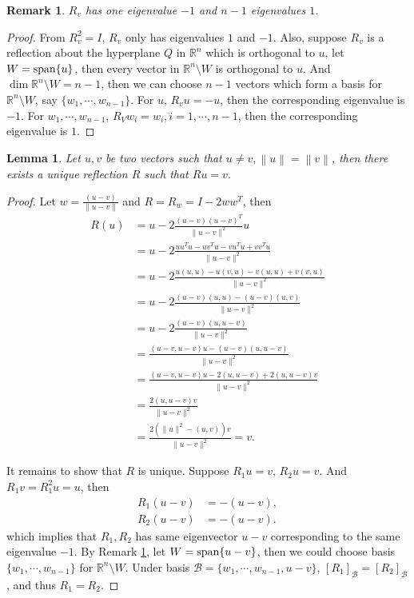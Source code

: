 \documentclass[11pt]{book}
\newtheorem{lemma}[theorem]{Lemma}
\newtheorem{remark}{Remark}[chapter]
\theoremstyle{definition}
\numberwithin{equation}{chapter}
\begin{document}
\begin{subappendices}
\begin{remark}\label{eigenvalue_of_reflection}
$R_v$ has one eigenvalue $-1$ and $n-1$ eigenvalues $1$.
\end{remark}
\begin{proof}
From $R_v^2 = I$, $R_v$ only has eigenvalues $1$ and $-1$. Also, suppose $R_v$ is a reflection about the hyperplane $Q$ in $\mathbb{R}^n$ which is orthogonal to $u$, let $W = {\rm  span}\{u\}$, then every vector in $\mathbb{R}^n\setminus W$ is orthogonal to $u$. And $\dim  \mathbb{R}^n\setminus W = n - 1$, then we can choose $n - 1$ vectors which form a basis for $\mathbb{R}^n\setminus W$, say $\{w_1, \cdots, w_{n-1}\}$. For $u$, $R_v u = - u$, then the corresponding eigenvalue is $-1$. For $w_1, \cdots, w_{n-1}$, $R_V w_i = w_i, i = 1, \cdots, n-1$, then the corresponding eigenvalue is $1$.
\end{proof}

\medskip

\begin{lemma}{\rm \cite{35}}
Let $u, v$ be two vectors such that $u \neq v, \left\|u\right\| = \left\|v\right\|$, then there exists a unique reflection $R$ such that $Ru = v$.
\end{lemma}
\begin{proof}
Let $w = \frac{(u-v)}{\|u-v\|}$ and $R = R_w = I - 2 ww^T$, then
\begin{align*}
    R(u) & = u - 2 \frac{(u-v)(u-v)^T}{\|u-v\|^2}u \\
    & = u - 2 \frac{uu^Tu - uv^Tu - vu^Tu + vv^Tu}{\|u-v\|^2} \\
    & = u - 2 \frac{u(u,u) - u(v,u) - v(u,u) + v(v,u)}{\|u-v\|^2} \\
    & = u - 2 \frac{(u-v)(u,u) - (u-v)(u,v)}{\|u-v\|^2} \\
    & = u - 2 \frac{(u-v)(u,u-v)}{\|u-v\|^2} \\
    & = \frac{(u-v,u-v)u - (u-v)(u,u-v)}{\|u-v\|^2} \\
    & = \frac{(u-v,u-v)u - 2(u,u-v) + 2(u,u-v)v}{\|u-v\|^2} \\
    & = \frac{2(u,u-v)v}{\|u-v\|^2} \\
    & = \frac{2(\|u\|^2 - (u,v))v}{\|u-v\|^2} = v.
\end{align*}

It remains to show that $R$ is unique. Suppose $R_1 u = v$, $R_2 u = v$. And $R_1 v = R_1^2 u = u$, then 
\begin{align*}
    R_1 (u-v) & = - (u-v), \\
    R_2 (u-v) & = - (u-v).
\end{align*}
which implies that $R_1, R_2$ has same eigenvector $u - v$ corresponding to the same eigenvalue $-1$. By Remark \ref{eigenvalue_of_reflection}, let $W = {\rm span}\{u-v\}$, then we could choose basis $\{w_1, \cdots, w_{n-1}\}$ for $\mathbb{R}^n \setminus W$. Under basis $\mathcal{B} = \{w_1, \cdots, w_{n-1}, u-v\}$, $[R_1]_{\mathcal{B}} = [R_2]_{\mathcal{B}}$, and thus $R_1 = R_2$.
\end{proof}


\end{subappendices}
\end{document}
